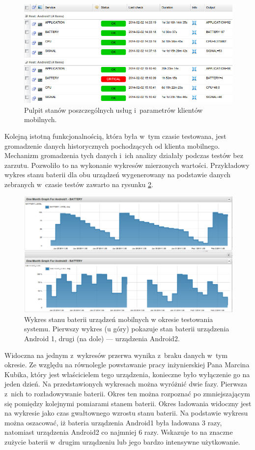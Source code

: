 \begin{figure}[ht]
  \caption{Pulpit stanów poszczególnych usług i~parametrów klientów
    mobilnych.}
  \label{fig:criticalBat}
  \centering
\includegraphics[width=1\textwidth]{img/criticalBat.png}
\end{figure}

Kolejną istotną funkcjonalnością, która była w~tym czasie testowana,
jest gromadzenie danych historycznych pochodzących od klienta
mobilnego. Mechanizm gromadzenia tych danych i~ich analizy działały
podczas testów bez zarzutu. Pozwoliło to na wykonanie wykresów
mierzonych wartości. Przykładowy wykres stanu baterii dla obu urządzeń
wygenerowany na podstawie danych zebranych w~czasie testów zawarto na
rysunku \ref{fig:baterie}.
 
\begin{figure}[ht]
  \caption{Wykres stanu baterii urządzeń mobilnych w okresie
    testowania systemu. Pierwszy wykres (u góry) pokazuje stan baterii
    urządzenia Android 1, drugi (na dole) --- urządzenia Android2.}
  \label{fig:baterie}
  \centering
\includegraphics[width=1\textwidth]{img/battery.png}
\end{figure}

Widoczna na jednym z~wykresów przerwa wynika z~braku danych w~tym
okresie. Ze względu na równolegle powstawanie pracy inżynierskiej Pana
Marcina Kubika, który jest właścicielem tego urządzenia, konieczne
było wyłączenie go na jeden dzień. Na przedstawionych wykresach można
wyróżnić dwie fazy. Pierwsza z~nich to rozładowywanie baterii. Okres
ten można rozpoznać po zmniejszającym się pomiędzy kolejnymi pomiarami
stanem baterii. Okres ładowania widoczny jest na wykresie jako czas
gwałtownego wzrostu stanu baterii. Na podstawie wykresu można
oszacować, iż bateria urządzenia Android1 była ładowana 3 razy,
natomiast urządzenia Android2 co najmniej 6 razy. Wskazuje to na
znaczne zużycie baterii w~drugim urządzeniu lub jego bardzo intensywne
użytkowanie.

